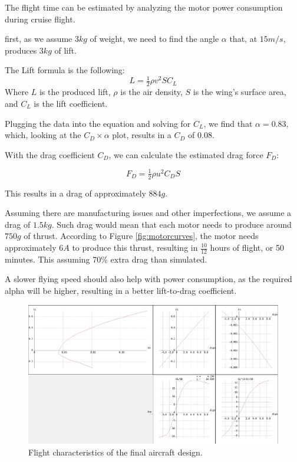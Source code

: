 The flight time can be estimated by analyzing the motor power consumption during cruise flight.

first, as we assume $ 3 kg $ of weight, we need to find the angle $\alpha$ that, at $15 m/s$, produces $3kg$ of lift.

The Lift formula is the following:
\begin{equation}
L=\tfrac{1}{2}\rho v^{2}SC_{L}
\end{equation}
Where $L$ is the produced lift, $\rho$ is the air density, $S$ is the wing's surface area, and $C_L$ is the lift coefficient.

Plugging the data into the equation and solving for $C_L$, we find that $\alpha = 0.83$, which, looking at the $C_D \times \alpha$ plot, results in a $C_D$ of 0.08.

With the drag coefficient $C_D$, we can calculate the estimated drag force $F_D$:

\begin{equation}
F_{D}=\tfrac{1}{2}\rho u^{2} C_{D} S
\end{equation}

This results in a drag of approximately $884 g$.

Assuming there are manufacturing issues and other imperfections, we assume a drag of $1.5 kg$. Such drag would mean that each motor needs to produce around $ 750 g$ of thrust. According to Figure \ref{fig:motorcurves}, the motor needs 
approximately $6 A$ to produce this thrust, resulting in $\frac{10}{12}$ hours of flight, or 50 minutes. This assuming 70\% extra drag than simulated.

A slower flying speed should also help with power consumption, as the required alpha will be higher, resulting in a better lift-to-drag coefficient.



\begin{figure}
\centering
  \includegraphics[width=\linewidth]{figs/craftpolar2.png}
  \caption{Flight characteristics of the final aircraft design.}
  \label{fig:craftpolar}
\end{figure}


